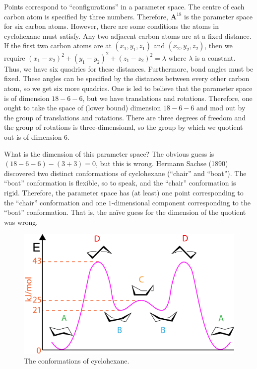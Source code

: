 \documentclass[11pt, oneside,margin=1in]{article}
\begin{document}
\begin{example}\label{}\text{}
Points correspond to ``configurations'' in a parameter space. The centre of each carbon atom is specified by three numbers. Therefore, $\mathbf{A}^{18}$ is the parameter space for six carbon atoms. However, there are some conditions the atoms in cyclohexane must satisfy. Any two adjacent carbon atoms are at a fixed distance. If the first two carbon atoms are at $(x_1,y_1,z_1)$ and $(x_2,y_2,z_2)$, then we require $(x_1-x_2)^2 + (y_1-y_2)^2 + (z_1-z_2)^2=\lambda$ where $\lambda$ is a constant. Thus, we have six quadrics for these distances. Furthermore, bond angles must be fixed. These angles can be specified by the distances between every other carbon atom, so we get six more quadrics. One is led to believe that the parameter space is of dimension $18-6-6$, but we have translations and rotations. Therefore, one ought to take the space of (lower bound) dimension $18-6-6$ and mod out by the group of translations and rotations. There are three degrees of freedom and the group of rotations is three-dimensional, so the group by which we quotient out is of dimension $6$. 

What is the dimension of this parameter space? The obvious guess is $ (18-6-6) - (3+3)=0$, but this is wrong. Hermann Sachse (1890) discovered two distinct conformations of cyclohexane (``chair'' and ``boat''). The ``boat'' conformation is flexible, so to speak, and the ``chair'' conformation is rigid. Therefore, the parameter space has (at least) one point corresponding to the ``chair'' conformation and one $1$-dimensional component corresponding to the ``boat'' conformation. That is, the na\"ive guess for the dimension of the quotient was wrong.
\end{example}
\iffalse
\begin{figure}
	\begin{center}
		\includegraphics[scale=0.5]{images/cyclohexane_conformations}
		\caption{The conformations of cyclohexane.}
	\end{center}
\end{figure}
\end{document}
